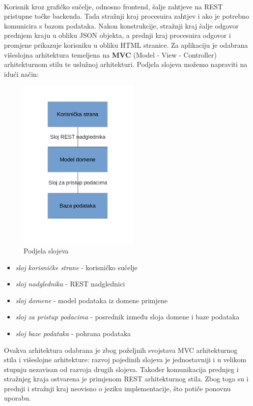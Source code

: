 	\\
	Korisnik kroz grafičko sučelje, odnosno frontend, šalje zahtjeve na REST pristupne točke backenda. Tada stražnji kraj procesuira zahtjev i ako je potrebno komunicira s bazom podataka. Nakon konstrukcije, stražnji kraj šalje odgovor prednjem kraju u obliku JSON objekta, a prednji kraj procesuira odgovor i promjene prikazuje korisniku u obliku HTML stranice.
	Za aplikaciju je odabrana višeslojna arhitektura temeljena na \textbf{MVC} (Model - View - Controller) arhitekturnom stilu te uslužnoj arhitekturi. Podjela slojeva možemo napraviti na idući način:
	\begin{figure}[H]
			\centering
			\includegraphics[scale=0.9]{slike/arhitektura2.png}
			\caption{Podjela slojeva}
			\label{fig:slojevi}
		\end{figure}
	\begin{itemize}
\eject
		\item 	\textit{sloj korisničke strane} - korisničko sučelje
		\item 	\textit{sloj nadglednika} - REST nadglednici
		\item 	\textit{sloj domene}	- model podataka iz domene primjene
		\item 	\textit{sloj za pristup podacima} - posrednik između sloja domene i baze podataka
		\item 	\textit{sloj baze podataka} - pohrana podataka	
		\end{itemize}
	{Ovakva arhitektura odabrana je zbog poželjnih svojstava MVC arhitekturnog stila i višeslojne arhitekture: razvoj pojedinih slojeva je jednostavniji i u velikom stupnju nezavisan od razvoja drugih slojeva. Također komunikacija prednjeg i stražnjeg kraja ostvarena je primjenom REST arhitekturnog stila. Zbog toga su i prednji i stražnji kraj neovisno o jeziku implementacije, što potiče ponovnu uporabu. }
	
